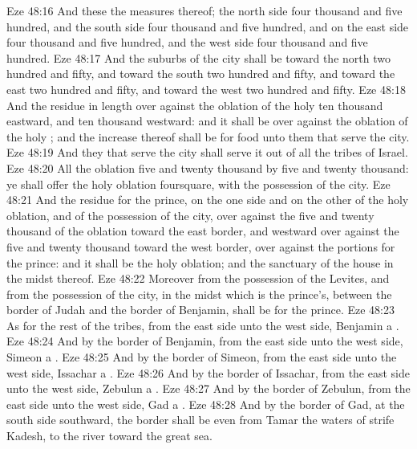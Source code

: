 \vs Eze 48:16 And these  the measures thereof; the north side four thousand and five hundred, and the south side four thousand and five hundred, and on the east side four thousand and five hundred, and the west side four thousand and five hundred.
\vs Eze 48:17 And the suburbs of the city shall be toward the north two hundred and fifty, and toward the south two hundred and fifty, and toward the east two hundred and fifty, and toward the west two hundred and fifty.
\vs Eze 48:18 And the residue in length over against the oblation of the holy  ten thousand eastward, and ten thousand westward: and it shall be over against the oblation of the holy ; and the increase thereof shall be for food unto them that serve the city.
\vs Eze 48:19 And they that serve the city shall serve it out of all the tribes of Israel.
\vs Eze 48:20 All the oblation  five and twenty thousand by five and twenty thousand: ye shall offer the holy oblation foursquare, with the possession of the city.
\vs Eze 48:21 And the residue  for the prince, on the one side and on the other of the holy oblation, and of the possession of the city, over against the five and twenty thousand of the oblation toward the east border, and westward over against the five and twenty thousand toward the west border, over against the portions for the prince: and it shall be the holy oblation; and the sanctuary of the house  in the midst thereof.
\vs Eze 48:22 Moreover from the possession of the Levites, and from the possession of the city,  in the midst  which is the prince's, between the border of Judah and the border of Benjamin, shall be for the prince.
\vs Eze 48:23 As for the rest of the tribes, from the east side unto the west side, Benjamin  a .
\vs Eze 48:24 And by the border of Benjamin, from the east side unto the west side, Simeon  a .
\vs Eze 48:25 And by the border of Simeon, from the east side unto the west side, Issachar a .
\vs Eze 48:26 And by the border of Issachar, from the east side unto the west side, Zebulun a .
\vs Eze 48:27 And by the border of Zebulun, from the east side unto the west side, Gad a .
\vs Eze 48:28 And by the border of Gad, at the south side southward, the border shall be even from Tamar  the waters of strife  Kadesh,  to the river toward the great sea.
